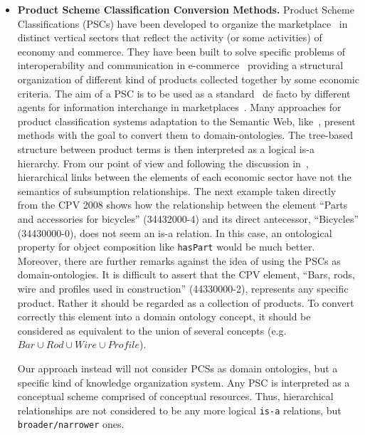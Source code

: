 \begin{itemize}
 \item \textbf{Product Scheme Classification Conversion Methods.}  Product Scheme Classifications (PSCs) have been developed to 
 organize the marketplace~\cite{Leukel-automating,Leukel-comparative} in distinct vertical sectors that reflect the 
 activity (or some activities) of economy and commerce. They have been built to solve specific problems of 
 interoperability and communication in e-commerce~\cite{Leukel-findings} providing a structural organization 
 of different kind of products collected together by some economic criteria. The aim of a PSC is to be used 
 as a standard~\cite{Leukel-standard} de facto by different agents for information interchange 
 in marketplaces~\cite{FenselOmel2001,FenselDing2001}. Many approaches for product classification systems adaptation to the Semantic Web, 
 like~\cite{Lonsdale:2010:ROL:1743778.1744005}, present methods with the goal to convert them to domain-ontologies. 
 The tree-based structure between product terms is then interpreted as a logical is-a hierarchy. 
 From our point of view and following the discussion in~\cite{Hepp:2007:POR:1256315.1256337,Hepp:2006:SWS:1128590.1128683}, hierarchical 
 links between the elements of each economic sector have not the semantics of subsumption relationships. The next example 
 taken directly from the CPV 2008 shows how the relationship between the element ``Parts and accessories for bicycles'' (34432000-4) 
 and its direct antecessor, ``Bicycles'' (34430000-0), does not seem an is-a relation. In this case, an ontological 
 property for object composition like \texttt{hasPart} would be much better. Moreover, there are further 
 remarks against the idea of using the PSCs as domain-ontologies. It is difficult to assert 
 that the CPV element, ``Bars, rods, wire and profiles used in construction'' (44330000-2), represents 
 any specific product. Rather it should be regarded as a collection of products. 
 To convert correctly this element into a domain ontology concept, it should be considered 
 as equivalent to the union of several concepts (e.g. $Bar \cup Rod \cup Wire \cup Profile$).
 
 Our approach instead will not consider PCSs as domain ontologies, but a specific kind of knowledge organization system. Any PSC is 
 interpreted as a conceptual scheme comprised of conceptual resources. Thus, hierarchical relationships are not 
 considered to be any more logical \texttt{is-a} relations, but \texttt{broader/narrower} ones. 

\end{itemize}
